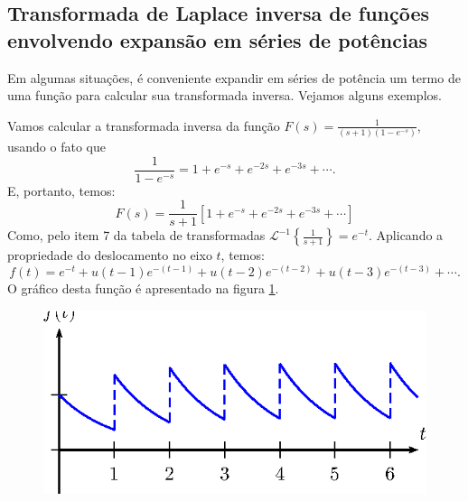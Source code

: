 \subsection{Transformada de Laplace inversa de funções envolvendo expansão em séries de potências}
Em algumas situações, é conveniente expandir em séries de potência um termo de uma função para calcular sua transformada inversa. Vejamos alguns exemplos.
\begin{ex} Vamos calcular a transformada inversa da função $F(s)=\frac{1}{(s+1)(1-e^{-s})}$, usando o fato que
\begin{equation}\frac{1}{1-e^{-s}}=1+e^{-s}+e^{-2s}+e^{-3s}+\cdots.\end{equation}
E, portanto, temos:
 \begin{equation} F(s)= \frac{1}{s+1}\left[1+e^{-s}+e^{-2s}+e^{-3s}+\cdots \right]
 \end{equation}
 Como, pelo item 7 da tabela de transformadas $\mathcal{L}^{-1}\left\{\frac{1}{s+1}\right\}=e^{-t}.$
Aplicando a propriedade do deslocamento no eixo $t$, temos:
 \begin{equation} f(t)= e^{-t}+ u(t-1) e^{-(t-1)}+ u(t-2) e^{-(t-2)}+ u(t-3) e^{-(t-3)}+\cdots.
 \end{equation}
O gráfico desta função é apresentado na figura \ref{fig_exp_iterada}.
 \begin{figure}[!ht]
\begin{center}

\includegraphics{cap_especiais_coef_var/pics/figura_6}\end{center}
\caption{\label{fig_exp_iterada}}
\end{figure}
\end{ex}
